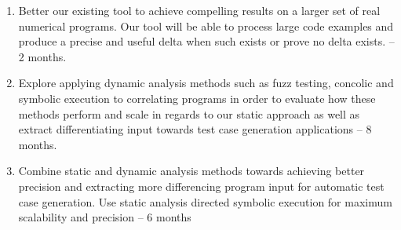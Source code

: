 \begin{enumerate}
\item Better our existing tool to achieve compelling results on a larger set of real numerical programs. Our tool will be able to process large code examples and produce a precise and useful delta when such exists or prove no delta exists. -- 2 months.
\item Explore applying dynamic analysis methods such as fuzz testing, concolic and symbolic execution to correlating programs in order to evaluate how these methods perform and scale in regards to our static approach as well as extract differentiating input towards test case generation applications -- 8 months.
\item Combine static and dynamic analysis methods towards achieving better precision and extracting more differencing program input for automatic test case generation. Use static analysis directed symbolic execution for maximum scalability and precision -- 6 months
\end{enumerate}

